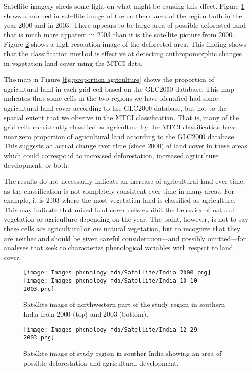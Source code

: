 Satellite imagery sheds some light on what might be causing this effect. Figure \ref{fig:north india} shows a zoomed in satellite image of the northern area of the region both in the year 2000 and in 2003. There appears to be large area of possible deforested land that is much more apparent in 2003 than it is the satellite picture from 2000. Figure \ref{fig:north india zoom} shows a high resolution image of the deforested area. This finding shows that the classification method is effective at detecting anthropomorphic changes in vegetation land cover using the MTCI data. 

The map in Figure \ref{fig:proportion agriculture} shows the proportion of agricultural land in each grid cell based on the GLC2000 database. This map indicates that some cells in the two regions we have identified had some agricultural land cover according to the GLC2000 database, but not to the spatial extent that we observe in the MTCI classification. That is, many of the grid cells consistently classified as agriculture by the MTCI classification have near zero proportion of agricultural land according to the GLC2000 database. This suggests an actual change over time (since 2000) of land cover in these areas which could correspond to increased deforestation, increased agriculture development, or both. 

The results do not necessarily indicate an increase of agricultural land over time, as the classification is not completely consistent over time in many areas. For example, it is 2003 where the most vegetation land is classified as agriculture. This may indicate that mixed land cover cells exhibit the behavior of natural vegetation or agriculture depending on the year. The point, however, is not to say these cells \emph{are} agricultural or \emph{are} natural vegetation, but to recognize that they are neither and should be given careful consideration---and possibly omitted---for analyses that seek to characterize phenological variables with respect to land cover. 


\label{sec:discussion}
\begin{figure}
	[htbp] \centering 
	\texttt{[image: Images-phenology-fda/Satellite/India-2000.png]} \\[1cm]
	\texttt{[image: Images-phenology-fda/Satellite/India-10-10-2003.png]} \\
	\caption{Satellite image of northwestern part of the study region in southern India from 2000 (top) and 2003 (bottom). } 
	
	\label{fig:north india} 
\end{figure}
\begin{figure}
	[htbp] \centering 
	\texttt{[image: Images-phenology-fda/Satellite/India-12-29-2003.png]} \caption{Satellite image of study region in souther India showing an area of possible deforestation and agricultural development.} 
	\label{fig:north india zoom} 
\end{figure}

